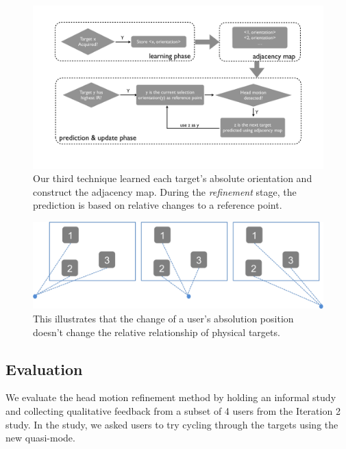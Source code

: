 \begin{figure}[t]
\centering
\includegraphics[width=0.95\columnwidth]{figures/third_technique.pdf}
\caption{Our third technique learned each target's absolute orientation and
construct the adjacency map. During the {\em refinement} stage, the prediction
is based on relative changes to a reference point.}
\label{fig:third_technique}
\end{figure}

\begin{figure}[t]
\centering
\includegraphics[width=0.95\columnwidth]{figures/third_principle.png}
\caption{This illustrates that the change of a user's absolution position
doesn't change the relative relationship of physical targets.}
\label{fig:third_principle}
\end{figure}


\subsection{Evaluation}
We evaluate the head motion refinement method by holding an informal study and
collecting qualitative feedback from a subset of 4 users from the Iteration 2
study. In the study, we asked users to try cycling through the targets using
the new quasi-mode.

